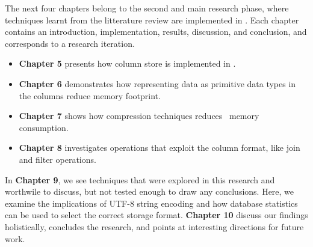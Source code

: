 The next four chapters belong to the second and main research phase, where techniques learnt from the litterature review are implemented in \gap. Each chapter contains an introduction, implementation, results, discussion, and conclusion, and corresponds to a research iteration.
\begin{itemize}
    \item \textbf{Chapter 5} presents how column store is implemented in \gap.
    \item \textbf{Chapter 6} demonstrates how representing data as primitive data types in the columns reduce memory footprint.
    \item \textbf{Chapter 7} shows how compression techniques reduces \gap~memory consumption.
    \item \textbf{Chapter 8} investigates operations that exploit the column format, like join and filter operations.
\end{itemize}

In \textbf{Chapter 9}, we see techniques that were explored in this research and worthwile to discuss, but not tested enough to draw any conclusions. Here, we examine the implications of UTF-8 string encoding and how database statistics can be used to select the correct storage format. \textbf{Chapter 10} discuss our findings holistically, concludes the research, and points at interesting directions for future work.





